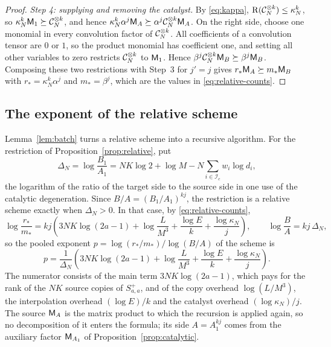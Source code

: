 \begin{proof}
\emph{Step 4: supplying and removing the catalyst.} By \eqref{eq:kappa},
\(\operatorname{R}(\mathcal C_N^{\otimes k})\le\kappa_N^k\), so
\(\kappa_N^k\mathsf M_1\succeq\mathcal C_N^{\otimes k}\), and hence
\(\kappa_N^k\alpha^j\mathsf M_A\succeq\alpha^j\mathcal C_N^{\otimes k}\mathsf M_A\). On the
right side, choose one monomial in every convolution factor of
\(\mathcal C_N^{\otimes k}\). All coefficients of a convolution tensor are \(0\)
or \(1\), so the product monomial has coefficient one, and setting all
other variables to zero restricts \(\mathcal C_N^{\otimes k}\) to \(\mathsf M_1\).
Hence \(\beta^j\mathcal C_N^{\otimes k}\mathsf M_B\succeq\beta^j\mathsf M_B\). Composing
these two restrictions with Step~3 for \(j'=j\) gives
\(r_*\mathsf M_A\succeq m_*\mathsf M_B\) with \(r_*=\kappa_N^k\alpha^j\) and
\(m_*=\beta^j\), which are the values in \eqref{eq:relative-counts}.
\end{proof}

\subsection{The exponent of the relative scheme}
\label{subsec:exponent}

Lemma~\ref{lem:batch} turns a relative scheme into a recursive algorithm.
For the restriction of Proposition~\ref{prop:relative}, put
\begin{equation}\label{eq:delta-N}
 \Delta_N=\log\frac{B_1}{A_1}
 =NK\log2+\log M-N\sum_{i\in\mathcal I_c}w_i\log d_i,
\end{equation}
the logarithm of the ratio of the target side to the source side in one
use of the catalytic degeneration. Since \(B/A=(B_1/A_1)^{kj}\), the
restriction is a relative scheme exactly when \(\Delta_N>0\). In that
case, by \eqref{eq:relative-counts},
\[
 \log\frac{r_*}{m_*}
 =kj\left(3NK\log(2a-1)+\log\frac{L}{M^3}+\frac{\log E}{k}
          +\frac{\log\kappa_N}{j}\right),
 \qquad \log\frac BA=kj\,\Delta_N,
\]
so the pooled exponent \(p=\log(r_*/m_*)/\log(B/A)\) of the scheme is
\begin{equation}\label{eq:pooled-exponent}
 p=\frac1{\Delta_N}\left(3NK\log(2a-1)+\log\frac{L}{M^3}
   +\frac{\log E}{k}+\frac{\log\kappa_N}{j}\right).
\end{equation}
The numerator consists of the main term \(3NK\log(2a-1)\), which pays for
the rank of the \(NK\) source copies of \(S^+_{a,a}\), and of the copy
overhead \(\log(L/M^3)\), the interpolation overhead \((\log E)/k\) and
the catalyst overhead \((\log\kappa_N)/j\). The source \(\mathsf M_A\) is the
matrix product to which the recursion is applied again, so no decomposition
of it enters the formula; its side \(A=A_1^{kj}\) comes from the auxiliary
factor \(\mathsf M_{A_1}\) of Proposition~\ref{prop:catalytic}.

